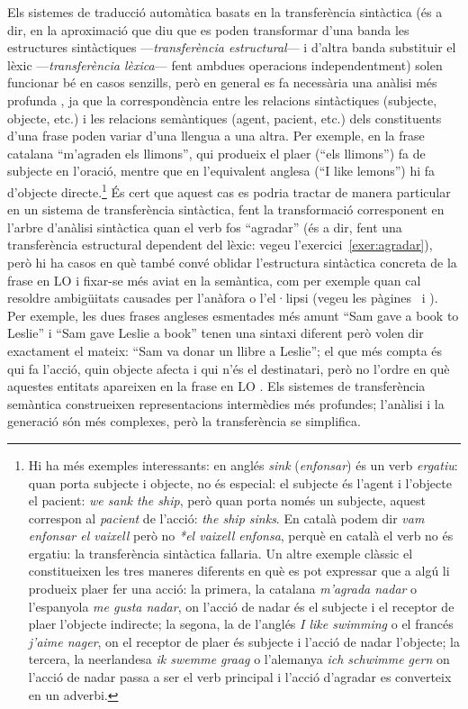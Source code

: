   
  Els sistemes de traducció automàtica basats en la transferència
  sintàctica (és a dir, en la aproximació que diu que es poden
  transformar d'una banda les estructures sintàctiques
  ---\emph{transferència estructural}--- i d'altra banda substituir el
  lèxic ---\emph{transferència lèxica}--- fent ambdues operacions
  independentment) solen funcionar bé en casos senzills, però en
  general es fa necessària una anàlisi més profunda \citep{hovy93j},
  ja que la correspondència entre les relacions sintàctiques
  (subjecte, objecte, etc.)  i les relacions semàntiques (agent,
  pacient, etc.)  dels constituents d'una frase poden variar d'una
  llengua a una altra. Per exemple, en la frase catalana ``m'agraden
  els llimons'', qui produeix el plaer (``els llimons'') fa de
  subjecte en l'oració, mentre que en l'equivalent anglesa (``I like
  lemons'') hi fa d'objecte directe.\footnote{Hi ha més exemples
  interessants: en anglés \emph{sink} (\emph{enfonsar}) és un verb
  \emph{ergatiu}: quan porta subjecte i objecte, no és especial: el
  subjecte és l'agent i l'objecte el pacient: \emph{we sank the ship},
  però quan 
  porta només un subjecte, aquest correspon al \emph{pacient} de
  l'acció: \emph{the ship sinks}. En català podem dir \emph{vam enfonsar
  el vaixell} però no \emph{*el vaixell enfonsa}, perquè en català el
  verb no és ergatiu: la transferència sintàctica fallaria. Un altre exemple
  clàssic el constitueixen les tres maneres diferents en què es pot
  expressar que a algú li produeix plaer fer una acció: la primera, la
  catalana \emph{m'agrada nadar} o l'espanyola \emph{me gusta nadar},
  on l'acció de nadar és el subjecte i el receptor de plaer l'objecte indirecte; la
  segona, la de l'anglés \emph{I like swimming} o el francés
  \emph{j'aime nager}, on el receptor de plaer és subjecte i l'acció
  de nadar
  l'objecte; la tercera, la neerlandesa \emph{ik swemme graag} o
  l'alemanya \emph{ich schwimme gern} on l'acció de nadar passa a ser el
  verb principal i l'acció d'agradar es converteix en un adverbi.} És cert que aquest cas es podria
  tractar de manera particular en un sistema de transferència
  sintàctica, fent la transformació corresponent en l'arbre d'anàlisi
  sintàctica quan el verb fos ``agradar'' (és a dir, fent una
  transferència estructural dependent del lèxic: vegeu l'exercici~\ref{exer:agradar}), però hi ha casos en
  què també convé oblidar l'estructura sintàctica concreta de la frase
  en LO i fixar-se més aviat en la semàntica, com per exemple quan cal
  resoldre ambigüitats causades per l'anàfora o l'el·lipsi (vegeu
  les pàgines~\pageref{pg:anafora} i \pageref{pg:ellipsi}).  Per
  exemple, les dues frases angleses esmentades més amunt ``Sam gave a
  book to Leslie'' i ``Sam gave Leslie a book'' tenen una sintaxi
  diferent però volen dir exactament el mateix: ``Sam va donar un
  llibre a Leslie''; el que més compta és qui fa l'acció, quin objecte
  afecta i qui n'és el destinatari, però no l'ordre en què aquestes
  entitats apareixen en la frase en LO \citep{arnold93j}. Els sistemes
  de transferència semàntica construeixen representacions intermèdies
  més profundes; l'anàlisi i la generació són més complexes, però la
  transferència se simplifica.

